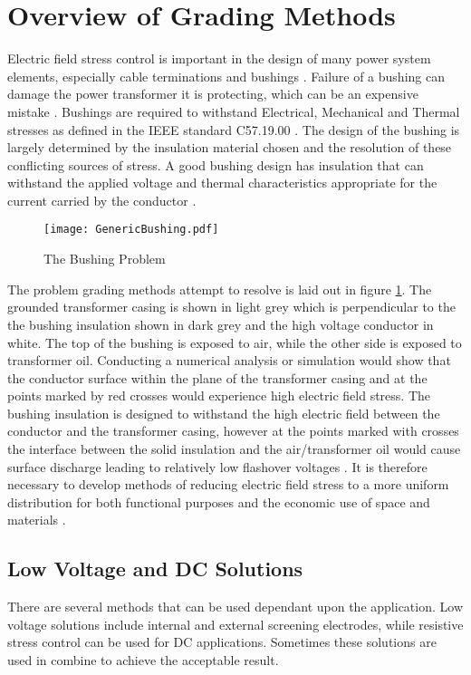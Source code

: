 \section{Overview of Grading Methods} \label{s:method}
Electric field stress control is important in the design of many power system elements, especially cable terminations and bushings \cite{james2008condition}.
Failure of a bushing can damage the power transformer it is protecting, which can be an expensive mistake \cite{warne2005newnes}.
Bushings are required to withstand Electrical, Mechanical and Thermal stresses as defined in the IEEE standard C57.19.00 \cite{1440990}.
The design of the bushing is largely determined by the insulation material chosen and the resolution of these conflicting sources of stress.
A good bushing design has insulation that can withstand the applied voltage and thermal characteristics appropriate for the current carried by the conductor \cite{harlow2004electric}.

\begin{figure}[!h]
   \centering
   \texttt{[image: GenericBushing.pdf]}
   \caption{The Bushing Problem}
   \label{figure:problem}
\end{figure}

The problem grading methods attempt to resolve is laid out in figure \ref{figure:problem}.
The grounded transformer casing is shown in light grey which is perpendicular to the the bushing insulation shown in dark grey and the high voltage conductor in white.
The top of the bushing is exposed to air, while the other side is exposed to transformer oil.
Conducting a numerical analysis or simulation would show that the conductor surface within the plane of the transformer casing and at the points marked by red crosses would experience high electric field stress.
The bushing insulation is designed to withstand the high electric field between the conductor and the transformer casing, however at the points marked with crosses the interface between the solid insulation and the air/transformer oil would cause surface discharge leading to relatively low flashover voltages \cite{kuffel2000high}.
It is therefore necessary to develop methods of reducing electric field stress to a more uniform distribution for both functional purposes and the economic use of space and materials \cite{james2008condition}.

\subsection{Low Voltage and DC Solutions}
There are several methods that can be used dependant upon the application.
Low voltage solutions include internal and external screening electrodes, while resistive stress control can be used for DC applications. Sometimes these solutions are used in combine to achieve the acceptable result.

